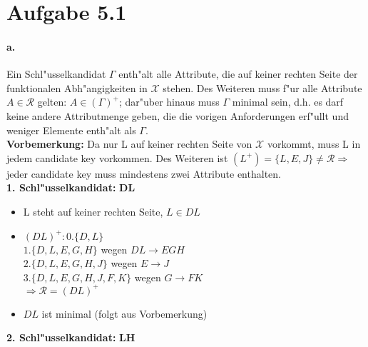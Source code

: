 \documentclass{article}
\begin{document}
	
	
	
	\section*{Aufgabe 5.1}
		\paragraph*{a.} Ein Schl"usselkandidat $ \Gamma $ enth"alt alle Attribute, die auf keiner rechten Seite der funktionalen Abh"angigkeiten in $ \mathcal{X} $ stehen. Des Weiteren muss f"ur alle Attribute $A \in \mathcal{R} $ gelten: $ A \in (\Gamma)^+ $; dar"uber hinaus muss $ \Gamma $ minimal sein, d.h. es darf keine andere Attributmenge geben, die die vorigen Anforderungen erf"ullt und weniger Elemente enth"alt als $ \Gamma $.\\
		\textbf{Vorbemerkung:} Da nur L auf keiner rechten Seite von $ \mathcal{X} $ vorkommt, muss L in jedem candidate key vorkommen. Des Weiteren ist $ (L^+) = \{L,E,J\} \neq \mathcal{R} \Rightarrow $ jeder candidate key muss mindestens zwei Attribute enthalten.\\[1.2em] 
		\textbf{1. Schl"usselkandidat: }$ \mathbf{DL }$
		\begin{itemize}
			\item L steht auf keiner rechten Seite, $ L \in DL $ \checkmark
			\item $ (DL)^+: 0. \{D,L\} $\\
			$ 1. \{D,L,E,G,H\} $ \hspace*{20mm}wegen $ DL \rightarrow EGH $\\
			$ 2. \{D,L,E,G,H,J\} $ \hspace*{17mm}wegen $ E \rightarrow J $\\
			$ 3. \{D,L,E,G,H,J,F,K\} $ \hspace*{9mm}wegen $ G \rightarrow FK $\\
			$ \Rightarrow \mathcal{R} = (DL)^+$ \checkmark
			\item $ DL $ ist minimal (folgt aus Vorbemerkung) \checkmark\\[1.2em]
		\end{itemize}
		\textbf{2. Schl"usselkandidat: }$ \mathbf{LH} $
\end{document}
